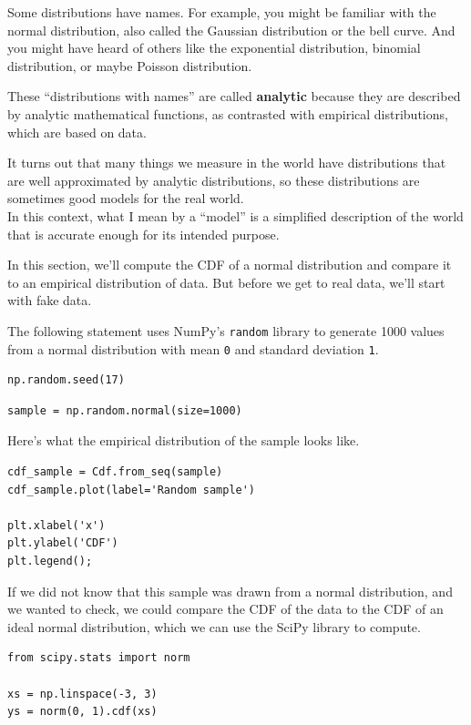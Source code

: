 Some distributions have names. For example, you might be familiar with
the normal distribution, also called the Gaussian distribution or the
bell curve. And you might have heard of others like the exponential
distribution, binomial distribution, or maybe Poisson distribution.

These ``distributions with names'' are called \textbf{analytic} because
they are described by analytic mathematical functions, as contrasted
with empirical distributions, which are based on data.

It turns out that many things we measure in the world have distributions
that are well approximated by analytic distributions, so these
distributions are sometimes good models for the real world.\\
In this context, what I mean by a ``model'' is a simplified description
of the world that is accurate enough for its intended purpose.

In this section, we'll compute the CDF of a normal distribution and
compare it to an empirical distribution of data. But before we get to
real data, we'll start with fake data.

The following statement uses NumPy's \passthrough{\lstinline!random!}
library to generate 1000 values from a normal distribution with mean
\passthrough{\lstinline!0!} and standard deviation
\passthrough{\lstinline!1!}.

\begin{lstlisting}[]
np.random.seed(17)
\end{lstlisting}

\begin{lstlisting}[]
sample = np.random.normal(size=1000)
\end{lstlisting}

Here's what the empirical distribution of the sample looks like.

\begin{lstlisting}[]
cdf_sample = Cdf.from_seq(sample)
cdf_sample.plot(label='Random sample')

plt.xlabel('x')
plt.ylabel('CDF')
plt.legend();
\end{lstlisting}

If we did not know that this sample was drawn from a normal
distribution, and we wanted to check, we could compare the CDF of the
data to the CDF of an ideal normal distribution, which we can use the
SciPy library to compute.

\begin{lstlisting}[]
from scipy.stats import norm

xs = np.linspace(-3, 3)
ys = norm(0, 1).cdf(xs)
\end{lstlisting}

